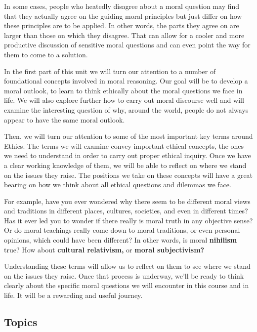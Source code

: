 \documentclass[
]{book}
\begin{document}
In some cases, people who heatedly disagree about a moral question may find that they actually agree on the guiding moral principles but just differ on how these principles are to be applied. In other words, the parts they agree on are larger than those on which they disagree. That can allow for a cooler and more productive discussion of sensitive moral questions and can even point the way for them to come to a solution.

In the first part of this unit we will turn our attention to a number of foundational concepts involved in moral reasoning. Our goal will be to develop a moral outlook, to learn to think ethically about the moral questions we face in life. We will also explore further how to carry out moral discourse well and will examine the interesting question of why, around the world, people do not always appear to have the same moral outlook.

Then, we will turn our attention to some of the most important key terms around Ethics. The terms we will examine convey important ethical concepts, the ones we need to understand in order to carry out proper ethical inquiry. Once we have a clear working knowledge of them, we will be able to reflect on where we stand on the issues they raise. The positions we take on these concepts will have a great bearing on how we think about all ethical questions and dilemmas we face.

For example, have you ever wondered why there seem to be different moral views and traditions in different places, cultures, societies, and even in different times? Has it ever led you to wonder if there really is moral truth in any objective sense? Or do moral teachings really come down to moral traditions, or even personal opinions, which could have been different? In other words, is moral \textbf{nihilism} true? How about \textbf{cultural relativism,} or \textbf{moral subjectivism?}

Understanding these terms will allow us to reflect on them to see where we stand on the issues they raise. Once that process is underway, we'll be ready to think clearly about the specific moral questions we will encounter in this course and in life. It will be a rewarding and useful journey.

\hypertarget{topics}{%
\subsection*{Topics}\label{topics}}
\end{document}

